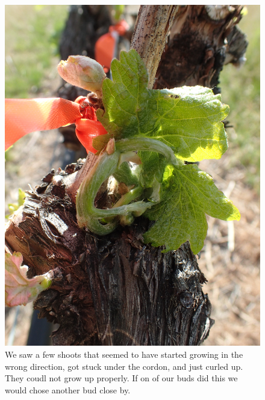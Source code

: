 \documentclass[11pt,letter]{article}
\begin{document}
\begin{figure}%
  \includegraphics[width=\linewidth]{CurledLeaf.jpg}
  \caption{We saw a few shoots that seemed to have started growing in the wrong direction, got stuck under the cordon, and just curled up. They coudl not grow up properly. If on of our buds did this we would chose another bud close by. }
  \label{fig:CurledLeaf}
\end{figure} 
\end{document}

